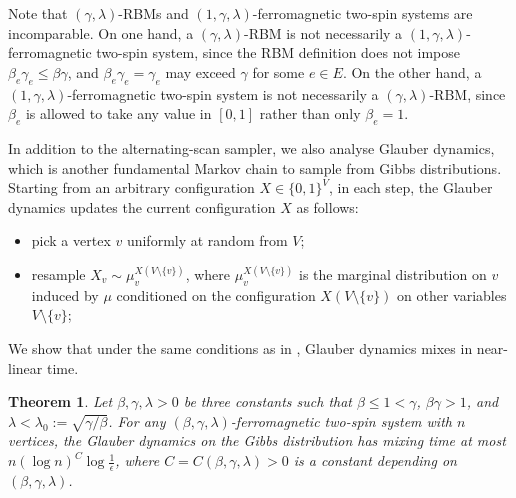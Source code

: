 \documentclass[11pt]{amsart}
\newcommand{\defeq}{:=}
\newtheorem{theorem}{Theorem}
\theoremstyle{definition}
\theoremstyle{remark}
\begin{document}
Note that $(\gamma,\lambda)$-RBMs and $(1,\gamma,\lambda)$-ferromagnetic two-spin systems are incomparable. On one hand, a $(\gamma,\lambda)$-RBM is not necessarily a $(1,\gamma,\lambda)$-ferromagnetic two-spin system, since the RBM definition does not impose $\beta_e\gamma_e \le \beta\gamma$, and $\beta_e\gamma_e = \gamma_e$ may exceed $\gamma$ for some $e\in E$. On the other hand, a $(1,\gamma,\lambda)$-ferromagnetic two-spin system is not necessarily a $(\gamma,\lambda)$-RBM, since $\beta_e$ is allowed to take any value in $[0,1]$ rather than only $\beta_e = 1$.



In addition to the alternating-scan sampler, we also analyse Glauber dynamics,
which is another fundamental Markov chain to sample from Gibbs distributions.
Starting from an arbitrary configuration $X \in \{0,1\}^V$, in each step, the Glauber dynamics updates the current configuration $X$ as follows:
\begin{itemize}
    \item pick a vertex $v$ uniformly at random from $V$;
    \item resample $X_v \sim \mu_{v}^{X(V \setminus \{v\})}$, where $\mu_{v}^{X(V \setminus \{v\})}$ is the marginal distribution on $v$ induced by $\mu$ conditioned on the configuration $X(V \setminus \{v\})$ on other variables $V \setminus \{v\}$;
\end{itemize}
We show that under the same conditions as in ,
Glauber dynamics mixes in near-linear time.

\begin{theorem}\label{thm:glauber-mixing-2}
  Let $\beta,\gamma,\lambda > 0$ be three constants such that $\beta \leq 1 < \gamma$, $\beta\gamma > 1$, and $\lambda < \lambda_0 \defeq \sqrt{\gamma/\beta}$. 
    For any $(\beta,\gamma,\lambda)$-ferromagnetic two-spin system with $n$ vertices, 
    the Glauber dynamics on the Gibbs distribution has mixing time at most $n (\log n)^{C} \log \frac{1}{\epsilon}$, where $C = C(\beta,\gamma,\lambda) > 0$ is a constant depending on $(\beta,\gamma,\lambda)$.
\end{theorem}
\end{document}
